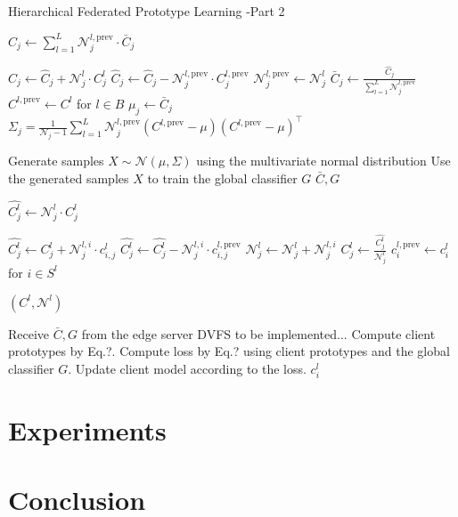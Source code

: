\documentclass[journal]{IEEEtran}
\begin{document}
\begin{algorithm}[H]
  \caption{Hierarchical Federated Prototype Learning -Part 2}
  \begin{algorithmic}[1]
    \State \( \hat{C}_{j} \gets \sum_{l=1}^{L} {\mathcal{N}_j^{l,\text{prev}}} \cdot\bar{C}_{j} \) 

    \State \( \hat{C}_{j}  \gets \hat{C}_{j} + {\mathcal{N}_j^l} \cdot C^l_j \)
    \State \( \hat{C}_{j}  \gets \hat{C}_{j} - {\mathcal{N}_j^{l,\text{prev}}} \cdot C_j^{l, \text{prev}} \)
    \EndIf
    \State \( {\mathcal{N}_j^{l,\text{prev}}} \gets \mathcal{N}_j^l \)
    \EndFor
    \State \( \bar{C}_{j} \gets \frac{\hat{C}_{j}}{\sum_{l=1}^{L} {\mathcal{N}_j^{l,\text{prev}}}} \)
    \EndFor
    \State \( C^{l,\text{prev}} \gets C^l \) for \( l \in B \)
    \State \(\mu_j \gets \bar{C}_j\)
    \State \(\Sigma_j = \frac{1}{\mathcal{N}_j-1} \sum_{l=1}^{L} {\mathcal{N}_j^{l,\text{prev}}}(C^{l,\text{prev}} - \mu)(C^{l,\text{prev}} - \mu)^\top\)
    \EndFor

    \State Generate samples \(X \sim \mathcal{N}(\mu, \Sigma)\) using the multivariate normal distribution
    \State Use the generated samples \(X\) to train the global classifier \( G \) 
    \State \Return \( \bar{C}, G \)
    \EndProcedure

    \State \( {\hat{C^l_j}} \gets \mathcal{N}^l_j \cdot C^l_{j} \)
    
    \State \( {\hat{C^l_j}}  \gets {\hat{C^l_j}} +  \mathcal{N}_j^{l, i} \cdot c^l_{i,j} \)
    \State \( {\hat{C^l_j}}  \gets {\hat{C^l_j}} - \mathcal{N}_j^{l, i} \cdot c^{l,\text{prev}}_{i,j}\)
    \Else
    \State \( \mathcal{N}_j^l \gets \mathcal{N}_j^l + \mathcal{N}_j^{l, i} \)
    \EndIf
    \EndFor
    \State \( {C^l_j} \gets \frac{{\hat{C^l_j}}}{\mathcal{N}_j^l} \)
    \EndFor
    \State \( c^{l,\text{prev}}_i \gets c^l_i \) for \( i \in S^l \)

    \State \Return \( (C^l, \mathcal{N}^l) \)
    \EndProcedure

    \State Receive \( \bar{C}, G \) from the edge server
    \State DVFS to be implemented...
    \State Compute client prototypes by Eq.?.
    \State Compute loss by Eq.? using client prototypes and the global classifier $G$.
    \State Update client model according to the loss.
    \EndFor
    \EndFor
    \State \Return \( c^l_i \)
    \EndProcedure
  \end{algorithmic}
\end{algorithm}

\section{Experiments}

\section{Conclusion}
\end{document}
